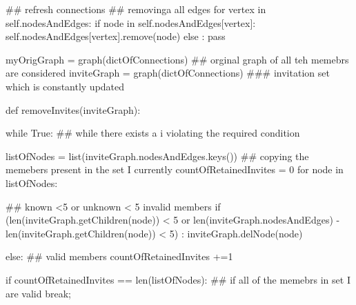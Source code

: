 \documentclass[11pt]{article}
\begin{document}
        ## refresh connections
            ## removinga all edges
            for vertex in self.nodesAndEdges:
                if node in self.nodesAndEdges[vertex]:
                    self.nodesAndEdges[vertex].remove(node)
        else :
            pass
        
        

myOrigGraph = graph(dictOfConnections) ## orginal graph of all teh memebrs are considered
inviteGraph = graph(dictOfConnections) ### invitation set which is constantly updated


def removeInvites(inviteGraph):
    
    while True: ## while there exists a i violating the required condition
    
        listOfNodes = list(inviteGraph.nodesAndEdges.keys()) ## copying the memebers present in the set I currently
        countOfRetainedInvites = 0
        for node in listOfNodes:
            
            ## known <5 or unknown < 5 invalid members
            if (len(inviteGraph.getChildren(node)) < 5 or  
                len(inviteGraph.nodesAndEdges) - len(inviteGraph.getChildren(node)) < 5) :
                inviteGraph.delNode(node)
                
                
            else: ## valid members
                countOfRetainedInvites +=1
                
        if countOfRetainedInvites == len(listOfNodes): ## if all of the memebrs in set I are valid
            break;
            
\end{document}
